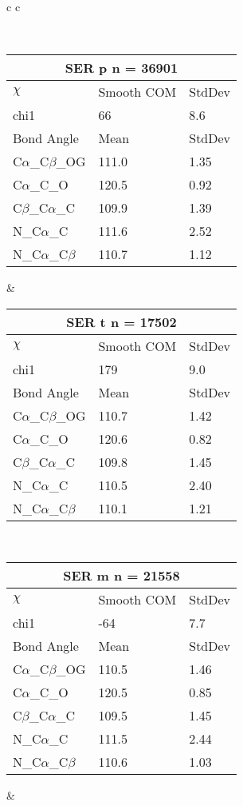 \begin{longtable}{ c c }
\caption{SER Central Values}\\
  \begin{tabular}{ l l l }
  \toprule
  \multicolumn{3}{c}{SER \textbf{p} n = 36901} \\ \toprule
  $\chi$       & Smooth COM & StdDev \\ \midrule
  chi1 & 66 & 8.6 \\ \midrule
  Bond Angle   & Mean     & StdDev \\ \midrule
  C$\alpha$\_C$\beta$\_OG & 111.0 & 1.35\\
  C$\alpha$\_C\_O & 120.5 & 0.92\\
  C$\beta$\_C$\alpha$\_C & 109.9 & 1.39\\
  N\_C$\alpha$\_C & 111.6 & 2.52\\
  N\_C$\alpha$\_C$\beta$ & 110.7 & 1.12\\
  \bottomrule
  \end{tabular}
  &
  \begin{tabular}{ l l l }
  \toprule
  \multicolumn{3}{c}{SER \textbf{t} n = 17502} \\ \toprule
  $\chi$       & Smooth COM & StdDev \\ \midrule
  chi1 & 179 & 9.0 \\ \midrule
  Bond Angle   & Mean     & StdDev \\ \midrule
  C$\alpha$\_C$\beta$\_OG & 110.7 & 1.42\\
  C$\alpha$\_C\_O & 120.6 & 0.82\\
  C$\beta$\_C$\alpha$\_C & 109.8 & 1.45\\
  N\_C$\alpha$\_C & 110.5 & 2.40\\
  N\_C$\alpha$\_C$\beta$ & 110.1 & 1.21\\
  \bottomrule
  \end{tabular}
  \\
  \begin{tabular}{ l l l }
  \toprule
  \multicolumn{3}{c}{SER \textbf{m} n = 21558} \\ \toprule
  $\chi$       & Smooth COM & StdDev \\ \midrule
  chi1 & -64 & 7.7 \\ \midrule
  Bond Angle   & Mean     & StdDev \\ \midrule
  C$\alpha$\_C$\beta$\_OG & 110.5 & 1.46\\
  C$\alpha$\_C\_O & 120.5 & 0.85\\
  C$\beta$\_C$\alpha$\_C & 109.5 & 1.45\\
  N\_C$\alpha$\_C & 111.5 & 2.44\\
  N\_C$\alpha$\_C$\beta$ & 110.6 & 1.03\\
  \bottomrule
  \end{tabular}
  &
  \\
  
\end{longtable}

